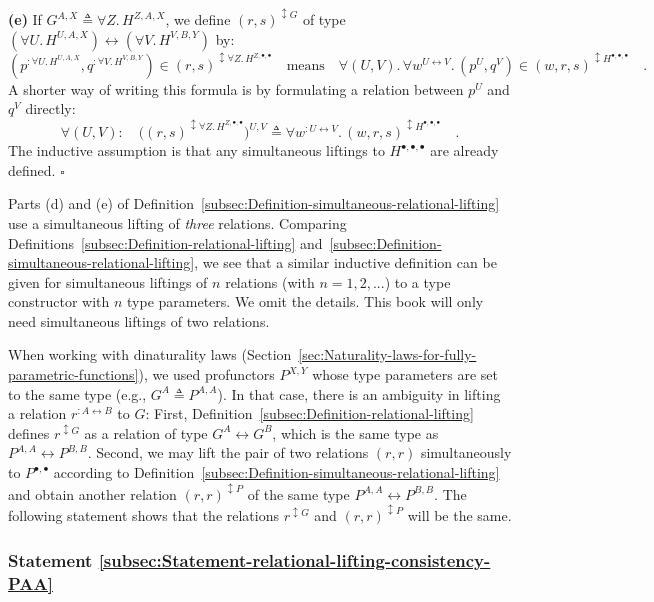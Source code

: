 \textbf{(e)} If $G^{A,X}\triangleq\forall Z.\,H^{Z,A,X}$, we define
$(r,s)^{\updownarrow G}$ of type $(\forall U.\,H^{U,A,X})\leftrightarrow(\forall V.\,H^{V,B,Y})$
by:
\[
(p^{:\forall U.\,H^{U,A,X}},q^{:\forall V.\,H^{V,B,Y}})\in(r,s)^{\updownarrow\forall Z.\,H^{Z,\bullet,\bullet}}\quad\text{means}\quad\forall(U,V).\,\forall w^{U\leftrightarrow V}.\,(p^{U},q^{V})\in(w,r,s)^{\updownarrow H^{\bullet,\bullet,\bullet}}\quad.
\]
A shorter way of writing this formula is by formulating a relation
between $p^{U}$ and $q^{V}$ directly:
\begin{equation}
\forall(U,V):\quad\big((r,s)^{\updownarrow\forall Z.\,H^{Z,\bullet,\bullet}}\big)^{U,V}\triangleq\forall w^{:U\leftrightarrow V}.\,(w,r,s)^{\updownarrow H^{\bullet,\bullet,\bullet}}\quad.\label{eq:relational-lifting-quantified-types-short-1}
\end{equation}
The inductive assumption is that any simultaneous liftings to $H^{\bullet,\bullet,\bullet}$
are already defined. $\square$

Parts (d) and (e) of Definition~\ref{subsec:Definition-simultaneous-relational-lifting}
use a simultaneous lifting of \emph{three} relations. Comparing Definitions~\ref{subsec:Definition-relational-lifting}
and~\ref{subsec:Definition-simultaneous-relational-lifting}, we
see that a similar inductive definition can be given for simultaneous
liftings of $n$ relations (with $n=1,2,...$) to a type constructor
with $n$ type parameters. We omit the details. This book will only
need simultaneous liftings of two relations.

When working with dinaturality laws (Section~\ref{sec:Naturality-laws-for-fully-parametric-functions}),
we used profunctors $P^{X,Y}$ whose type parameters are set to the
same type (e.g., $G^{A}\triangleq P^{A,A}$). In that case, there
is an ambiguity in lifting a relation $r^{:A\leftrightarrow B}$ to
$G$: First, Definition~\ref{subsec:Definition-relational-lifting}
defines $r^{\updownarrow G}$ as a relation of type $G^{A}\leftrightarrow G^{B}$,
which is the same type as $P^{A,A}\leftrightarrow P^{B,B}$. Second,
we may lift the pair of two relations $\left(r,r\right)$ simultaneously
to $P^{\bullet,\bullet}$ according to Definition~\ref{subsec:Definition-simultaneous-relational-lifting}
and obtain another relation $\left(r,r\right)^{\updownarrow P}$ of
the same type $P^{A,A}\leftrightarrow P^{B,B}$. The following statement
shows that the relations $r^{\updownarrow G}$ and $(r,r)^{\updownarrow P}$
will be the same.

\subsubsection{Statement \label{subsec:Statement-relational-lifting-consistency-PAA}\ref{subsec:Statement-relational-lifting-consistency-PAA}}

